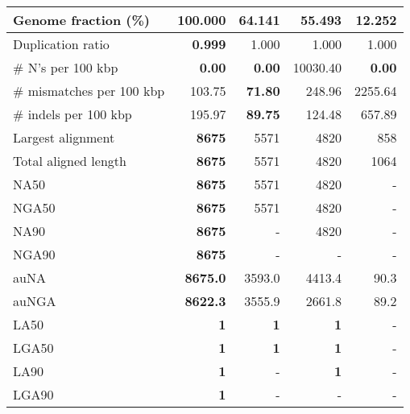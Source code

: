 \documentclass[12pt,a4paper]{article}
\begin{document}
\begin{table}[ht]
\begin{center}
\begin{tabular}{|l*{4}{|r}|}
Genome fraction (\%) & {\bf 100.000} & 64.141 & 55.493 & 12.252 \\ \hline
Duplication ratio & {\bf 0.999} & 1.000 & 1.000 & 1.000 \\ \hline
\# N's per 100 kbp & {\bf 0.00} & {\bf 0.00} & 10030.40 & {\bf 0.00} \\ \hline
\# mismatches per 100 kbp & 103.75 & {\bf 71.80} & 248.96 & 2255.64 \\ \hline
\# indels per 100 kbp & 195.97 & {\bf 89.75} & 124.48 & 657.89 \\ \hline
Largest alignment & {\bf 8675} & 5571 & 4820 & 858 \\ \hline
Total aligned length & {\bf 8675} & 5571 & 4820 & 1064 \\ \hline
NA50 & {\bf 8675} & 5571 & 4820 & - \\ \hline
NGA50 & {\bf 8675} & 5571 & 4820 & - \\ \hline
NA90 & {\bf 8675} & - & 4820 & - \\ \hline
NGA90 & {\bf 8675} & - & - & - \\ \hline
auNA & {\bf 8675.0} & 3593.0 & 4413.4 & 90.3 \\ \hline
auNGA & {\bf 8622.3} & 3555.9 & 2661.8 & 89.2 \\ \hline
LA50 & {\bf 1} & {\bf 1} & {\bf 1} & - \\ \hline
LGA50 & {\bf 1} & {\bf 1} & {\bf 1} & - \\ \hline
LA90 & {\bf 1} & - & {\bf 1} & - \\ \hline
LGA90 & {\bf 1} & - & - & - \\ \hline
\end{tabular}
\end{center}
\end{table}
\end{document}
